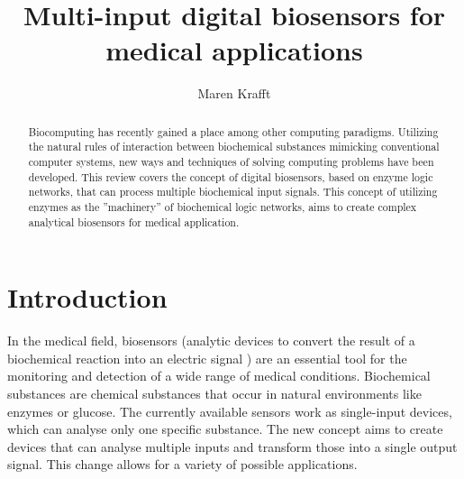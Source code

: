\documentclass[runningheads]{llncs}
\begin{document}
\pagestyle{empty}
\title{Multi-input digital biosensors for medical applications}
\author{Maren Krafft}
\maketitle        

      
\begin{abstract}
Biocomputing has recently gained a place among other computing paradigms. Utilizing the natural rules of interaction between biochemical substances mimicking conventional computer systems, new ways and techniques of solving computing problems have been developed. This review covers the concept of digital biosensors, based on enzyme logic networks, that can process multiple biochemical input signals. This concept of utilizing enzymes as the ''machinery'' of biochemical logic networks, aims to create complex analytical biosensors for medical application.


\end{abstract}


\section{Introduction}

	In the medical field, biosensors (analytic devices to convert the result of a biochemical reaction into an electric signal \cite{definitions}) are an essential tool for the monitoring and detection of a wide range of medical conditions. Biochemical substances are chemical substances that occur in natural environments like enzymes or glucose. The currently available sensors work as single-input devices, which can analyse only one specific substance. The new concept aims to create devices that can analyse multiple inputs and transform those into a single output signal. This change allows for a variety of possible applications. \cite{original}\\
	
\end{document}
